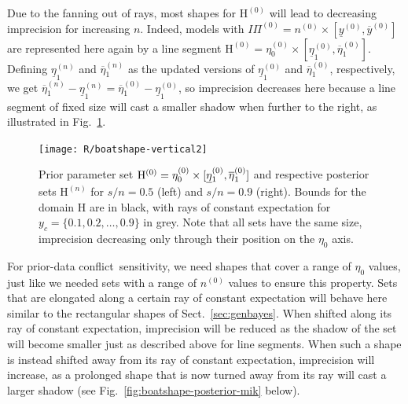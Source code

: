 \documentclass[runningheads,a4paper]{llncs}
\def\pdc{prior-data conflict}
\newcommand{\uz}{^{(0)}} %
\newcommand{\un}{^{(n)}} %
\newcommand{\ul}[1]{\underline{#1}}
\newcommand{\ol}[1]{\overline{#1}}
\def\yzl{\ul{y}\uz}
\def\yzu{\ol{y}\uz}
\def\nz{n\uz}
\def\PZ{I\!\!\Pi\uz}
\def\Eta{\mathrm{H}}
\def\EZ{\mathrm{H}\uz}
\def\EN{\mathrm{H}\un}
\def\ezz{\eta_0\uz}
\def\ezn{\eta_0\un}
\def\eozl{\ul{\eta}_1\uz}
\def\eozu{\ol{\eta}_1\uz}
\def\eonl{\ul{\eta}_1\un}
\def\eonu{\ol{\eta}_1\un}
\begin{document}
Due to the fanning out of rays, most shapes for $\EZ$ will lead to decreasing imprecision for increasing $n$.
Indeed, models with $\PZ = \nz \times [\yzl, \yzu]$
are represented here again by a line segment $\EZ = \ezz \times [\eozl,\eozu]$.
Defining $\eonl$ and $\eonu$ as the updated versions of $\eozl$ and $\eozu$, respectively,
we get $\eonu-\eonl = \eozu-\eozl$,
so imprecision decreases here because a line segment of fixed size
will cast a smaller shadow when further to the right,
as illustrated in Fig.~\ref{fig:boatshape-vertical}.
\begin{figure}  %
\centering
\texttt{[image: R/boatshape-vertical2]}%
\caption[Line segment parameter set $\EZ$ %
and respective posterior sets for $s/n=0.5$ and $s/n=0.9$.]%
{Prior parameter set $\EZ = \ezz \times [\text{\underline{$\eta$}${}_1\uz$},\eozu]$
and respective posterior sets $\EN$ for $s/n=0.5$ (left) and $s/n=0.9$ (right).
Bounds for the domain $\Eta$ are in black, with rays of constant expectation for $y_c = \{0.1,0.2,\ldots,0.9\}$ in grey. 
Note that all sets have the same size, imprecision decreasing only through their position on the $\eta_0$ axis.}
\label{fig:boatshape-vertical}
\end{figure}

For \pdc\ sensitivity, we need shapes that cover a range of $\eta_0$ values,
just like we needed sets with a range of $\nz$ values to ensure this property.
Sets that are elongated along a certain ray of constant expectation
will behave here similar to the rectangular shapes of Sect.~\ref{sec:genbayes}.
When shifted along its ray of constant expectation,
imprecision will be reduced as the shadow of the set will become smaller just as described above for line segments.
When such a shape is instead shifted away from its ray of constant expectation,
imprecision will increase, as a prolonged shape that is now turned away from its ray 
will cast a larger shadow (see Fig.~\ref{fig:boatshape-posterior-mik} below).%
\end{document}
